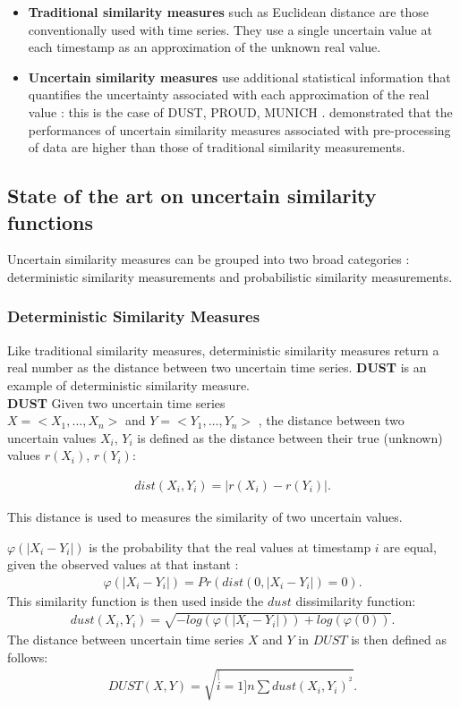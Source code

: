 \begin{itemize}
  \item \textbf{Traditional similarity measures} such as Euclidean distance are those conventionally used with time series. They use a single uncertain value at each timestamp as an approximation of
  the unknown real value.
  \item \textbf{Uncertain similarity measures} use additional statistical information that quantifies the uncertainty associated with each approximation of the real value : this is the case of
  DUST, PROUD, MUNICH \cite{dallachiesa}.  \cite{Orang2015} demonstrated that the performances of uncertain similarity measures associated with pre-processing of data are higher than those of traditional similarity measurements.
\end{itemize}


   

\subsection{State of the art on uncertain similarity functions}


Uncertain similarity measures  can be grouped into two broad categories : deterministic similarity measurements and probabilistic similarity measurements.

\subsubsection{Deterministic Similarity Measures} 
Like traditional similarity measures, deterministic  similarity measures  return a real number as the distance between two uncertain time series. \textbf{DUST} is an example of deterministic similarity measure.
\\
\textbf{DUST} \cite{murthy2013generalized} Given two uncertain time series \\ $X=<X_1, \ldots,X_n>$ and $Y=<Y_1, \ldots,Y_n>$ , the distance between two uncertain values $X_i$, $Y_i$ is defined as the distance between their true (unknown) values $r(X_i)$, $r(Y_i)$:

\begin{eqnarray}
 dist(X_i, Y_i) = |r(X_i) - r(Y_i)|.
\end{eqnarray}

 This distance is used to measures the similarity of two uncertain values. 

$\varphi(|X_{i}-Y_{i}|)$ is the probability that the real values at timestamp $i$   are equal, given the observed values at that instant :
\begin{eqnarray}
\varphi(|X_{i}-Y_{i}|)=Pr(dist(0, |X_{i}-Y_{i}|)=0).
\end{eqnarray}
This similarity function is then used inside the $dust$ dissimilarity function:
\begin{eqnarray}
dust(X_{i},Y_{i})=\sqrt{-log(\varphi(|X_{i}-Y_{i}|))+log(\varphi(0))}.
\end{eqnarray}
The distance between uncertain time series $X$ and $Y$ in $DUST$
is then defined as follows:
\begin{eqnarray}
DUST(X,Y)=\sqrt{\stackrel[i=1]{n}{\sum}dust(X_{i},Y_{i})^{^{2}}}.
\end{eqnarray} 


